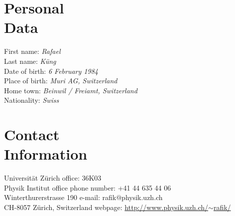 \documentclass[a4paper,margin,line,useAMS,usenatbib]{resume}
\begin{document}
\begin{resume}

\section{\mysidestyle Personal\\Data}

First name:           \emph{Rafael}\\
Last name:            \emph{Küng}\\
Date of birth:        \emph{6 February 1984}\\
Place of birth:       \emph{Muri AG, Switzerland}\\
Home town:            \emph{Beinwil / Freiamt, Switzerland}\\
Nationality:          \emph{Swiss}

\section{\mysidestyle Contact\\Information}

Universität Zürich                \hfill office: 36K03                              \\%
Physik Institut                   \hfill office phone number: +41 44 635 44 06      \\%
Winterthurerstrasse 190           \hfill e-mail: rafik$@$physik.uzh.ch              \\%
CH-8057 Z\"urich, Switzerland     \hfill webpage:
                                        \href{http://www.physik.uzh.ch/~rafik/}{http://www.physik.uzh.ch/$\sim$rafik/}




\end{resume}
\end{document}
